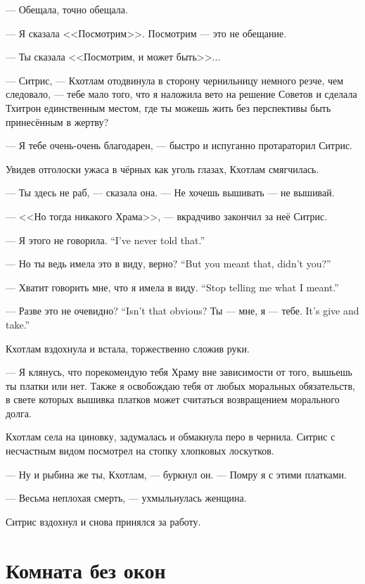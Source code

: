 --- Обещала, точно обещала.

--- Я сказала <<Посмотрим>>.
Посмотрим --- это не обещание.

--- Ты сказала <<Посмотрим, и может быть>>...

--- Ситрис, --- Кхотлам отодвинула в сторону чернильницу немного резче, чем следовало, --- тебе мало того, что я наложила вето на решение Советов и сделала Тхитрон единственным местом, где ты можешь жить без перспективы быть принесённым в жертву?

--- Я тебе очень-очень благодарен, --- быстро и испуганно протараторил Ситрис.

Увидев отголоски ужаса в чёрных как уголь глазах, Кхотлам смягчилась.

--- Ты здесь не раб, --- сказала она.
--- Не хочешь вышивать --- не вышивай.

--- <<Но тогда никакого Храма>>, --- вкрадчиво закончил за неё Ситрис.

{--- Я этого не говорила.}
{``I've never told that.''}

{--- Но ты ведь имела это в виду, верно?}
{``But you meant that, didn't you?''}

{--- Хватит говорить мне, что я имела в виду.}
{``Stop telling me what I meant.''}

{--- Разве это не очевидно?}
{``Isn't that obvious?}
{Ты --- мне, я --- тебе.}
{It's give and take.''}

Кхотлам вздохнула и встала, торжественно сложив руки.

--- Я клянусь, что порекомендую тебя Храму вне зависимости от того, вышьешь ты платки или нет.
Также я освобождаю тебя от любых моральных обязательств, в свете которых вышивка платков может считаться возвращением морального долга.

Кхотлам села на циновку, задумалась и обмакнула перо в чернила.
Ситрис с несчастным видом посмотрел на стопку хлопковых лоскутков.

--- Ну и рыбина же ты, Кхотлам, --- буркнул он.
--- Помру я с этими платками.

--- Весьма неплохая смерть, --- ухмыльнулась женщина.

Ситрис вздохнул и снова принялся за работу.

\chapter{Комната без окон}

